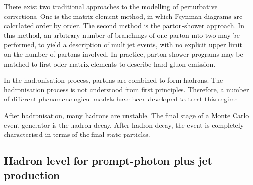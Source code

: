 \documentclass[12pt, twoside]{article}
\numberwithin{equation}{section}
\numberwithin{figure}{section}
\begin{document}
There exist two traditional approaches to the modelling of perturbative corrections. One is the matrix-element method, in which Feynman diagrams are calculated order by order. The second method is the parton-shower approach. In this method, an arbitrary number of branchings of one parton into two may be performed, to yield a description of multijet events, with no explicit upper limit on the number of partons involved. In practice, parton-shower programs may be matched to first-oder matrix elements to describe hard-gluon emission.

In the hadronisation process, partons are combined to form hadrons. The hadronisation process is not understood from first principles. Therefore, a number of different phenomenological models have been developed to treat this regime.

After hadronisation, many hadrons are unstable. The final stage of a Monte Carlo event generator is the hadron decay. After hadron decay, the event is completely characterised in terms of the final-state particles.

\subsection{Hadron level for prompt-photon plus jet production}
\label{subsec:HadronLevelForPrompt-PhotonPlusJetProduction}
\end{document}
